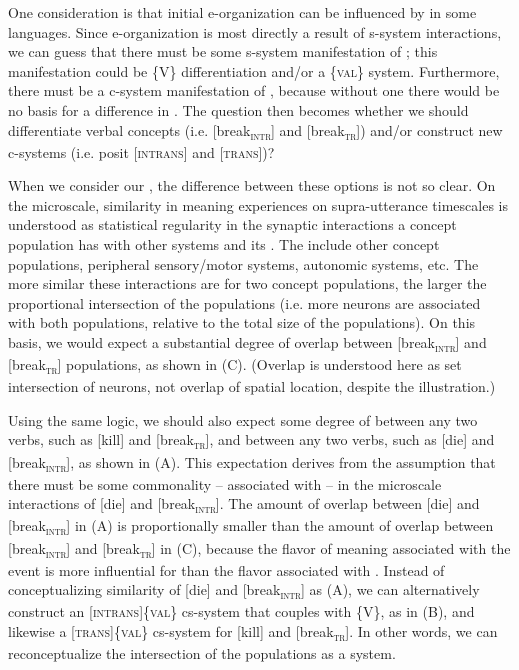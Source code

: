   One consideration is that initial e-organization can be influenced by  in some languages. Since e-organization is most directly a result of s-system interactions, we can guess that there must be some s-system manifestation of ; this manifestation could be \{V\} differentiation and/or a \{\textsc{val}\} system. Furthermore, there must be a c-system manifestation of , because without one there would be no basis for a difference in . The question then becomes whether we should differentiate verbal concepts (i.e. [break\textsc{\textsubscript{intr}}] and [break\textsc{\textsubscript{tr}}]) and/or construct new c-systems (i.e. posit [\textsc{intrans}] and [\textsc{trans}])?

  When we consider our , the difference between these options is not so clear. On the microscale, similarity in meaning experiences on supra-utterance timescales is understood as statistical regularity in the synaptic interactions a concept population has with other systems and its . The  include other concept populations, peripheral sensory/motor systems, autonomic systems, etc. The more similar these interactions are for two concept populations, the larger the proportional intersection of the populations (i.e. more neurons are associated with both populations, relative to the total size of the populations). On this basis, we would expect a substantial degree of overlap between [break\textsc{\textsubscript{intr}}] and [break\textsc{\textsubscript{tr}}] populations, as shown in {}(C). (Overlap is understood here as set intersection of neurons, not overlap of spatial location, despite the illustration.)

  Using the same logic, we should also expect some degree of  between any two  verbs, such as [kill] and [break\textsc{\textsubscript{tr}}], and between any two  verbs, such as [die] and [break\textsc{\textsubscript{intr}}], as shown in {}(A). This expectation derives from the assumption that there must be some commonality -- associated with  -- in the microscale  interactions of [die] and [break\textsc{\textsubscript{intr}}]. The amount of overlap between [die] and [break\textsc{\textsubscript{intr}}] in (A) is proportionally smaller than the amount of overlap between [break\textsc{\textsubscript{intr}}] and [break\textsc{\textsubscript{tr}}] in (C), because the flavor of meaning associated with the event is more influential for  than the flavor associated with . Instead of conceptualizing similarity of [die] and [break\textsc{\textsubscript{intr}}] as  (A), we can alternatively construct an [\textsc{intrans}]\{\textsc{val}\} cs-system that couples with \{V\}, as in (B), and likewise a [\textsc{trans}]\{\textsc{val}\} cs-system for [kill] and [break\textsc{\textsubscript{tr}}]. In other words, we can reconceptualize the intersection of the populations as a system.

